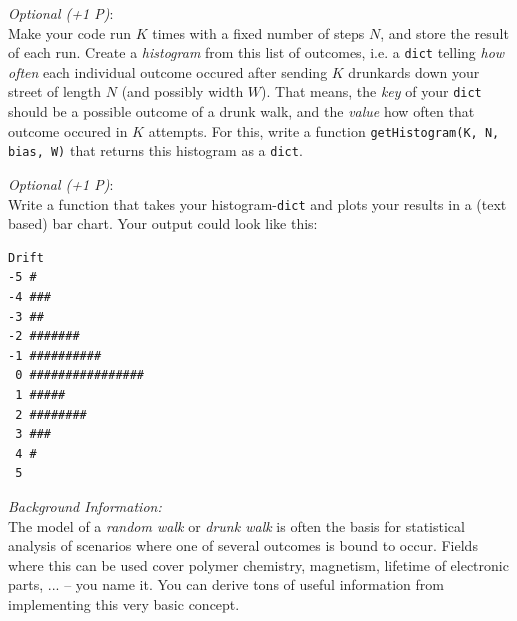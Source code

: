 \documentclass[
	english,
	fontsize=10pt,
	parskip=half,
	titlepage=true,
	DIV=12
]{scrartcl}
\newcommand*{\inPy}[1]{\texttt{#1}}
\newcommand*{\ie}{i.\;e. }
\begin{document}
\emph{Optional (+1 P)}:\\
Make your code run $K$ times with a fixed number of steps $N$, and store the result of each run. Create a \emph{histogram} from this list of outcomes, \ie a \inPy{dict} telling \emph{how often} each individual outcome occured after sending $K$ drunkards down your street of length $N$ (and possibly width $W$). That means, the \emph{key} of your \inPy{dict} should be a possible outcome of a drunk walk, and the \emph{value} how often that outcome occured in $K$ attempts. For this, write a function \inPy{getHistogram(K, N, bias, W)} that returns this histogram as a \inPy{dict}.

\emph{Optional (+1 P)}:\\
Write a function that takes your histogram-\inPy{dict} and plots your results in a (text based) bar chart. 
Your output could look like this:
\begin{verbatim}
Drift
-5 #
-4 ###
-3 ##
-2 #######
-1 ##########
 0 ################
 1 #####
 2 ########
 3 ###
 4 #
 5
\end{verbatim}

\emph{Background Information:}\\
The model of a \emph{random walk} or \emph{drunk walk} is often the basis for statistical analysis of scenarios where one of several outcomes is bound to occur. Fields where this can be used cover polymer chemistry, magnetism, lifetime of electronic parts, ... -- you name it. You can derive tons of useful information from implementing this very basic concept.
\end{document}
